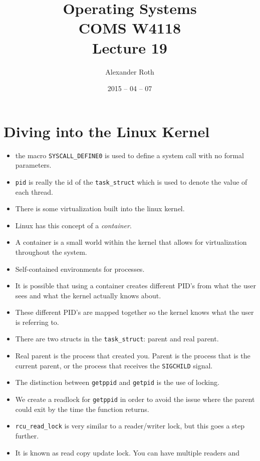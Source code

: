 \documentclass[]{article}
\begin{document}
\newcommand{\code}{\texttt}
\newtheorem{thm}{Theorem}
\title{Operating Systems \\ COMS W4118 \\ Lecture 19}
\author{Alexander Roth}
\date{2015 -- 04 -- 07}
\maketitle

\section{Diving into the Linux Kernel}
\begin{itemize}
\item the macro \code{SYSCALL\_DEFINE0} is used to define a system call with no
formal parameters.
\item \code{pid} is really the id of the \code{task\_struct} which is used to
denote the value of each thread.
\item There is some virtualization built into the linux kernel.
\item Linux has this concept of a \emph{container}.
\item A container is a small world within the kernel that allows for
virtualization throughout the system.
\item Self-contained environments for processes.
\item It is possible that using a container creates different PID's from what
the user sees and what the kernel actually knows about.
\item These different PID's are mapped together so the kernel knows what the
user is referring to.
\item There are two structs in the \code{task\_struct}: parent and real parent.
\item Real parent is the process that created you. Parent is the process that is
the current parent, or the process that receives the \code{SIGCHILD} signal.
\item The distinction between \code{getppid} and \code{getpid} is the use of
locking.
\item We create a readlock for \code{getppid} in order to avoid the issue where
the parent could exit by the time the function returns.
\item \code{rcu\_read\_lock} is very similar to a reader/writer lock, but this
goes a step further.
\item It is known as read copy update lock. You can have multiple readers and

\end{itemize}
\end{document}
